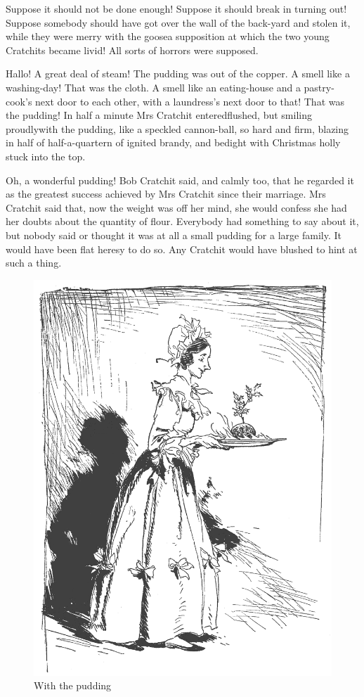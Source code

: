 \documentclass[paper=5.5in:8.5in,BCOR=10mm,twoside,DIV=15,12pt,usegeometry,openany]{scrbook} %
\begin{document}
Suppose it should not be done enough! Suppose it should break in turning out! Suppose somebody should have got over the wall of the back-yard and stolen it, while they were merry with the goose\textemdash a supposition at which the two young Cratchits became livid! All sorts of horrors were supposed.

Hallo! A great deal of steam! The pudding was out of the copper. A smell like a washing-day! That was the cloth. A smell like an eating-house and a pastry-cook's next door to each other, with a laundress's next door to that! That was the pudding! In half a minute Mrs Cratchit entered\textemdash flushed, but smiling proudly\textemdash with the pudding, like a speckled cannon-ball, so hard and firm, blazing in half of half-a-quartern of ignited brandy, and bedight with Christmas holly stuck into the top.

Oh, a wonderful pudding! Bob Cratchit said, and calmly too, that he regarded it as the greatest success achieved by Mrs Cratchit since their marriage. Mrs Cratchit said that, now the weight was off her mind, she would confess she had her doubts about the quantity of flour. Everybody had something to say about it, but nobody said or thought it was at all a small pudding for a large family. It would have been flat heresy to do so. Any Cratchit would have blushed to hint at such a thing.

\begin{figure}
\begin{minipage}[c]{\linewidth}
\includegraphics[width=\linewidth]{pudding2}
\caption*{With the pudding}
\end{minipage}
\end{figure}
\end{document}
